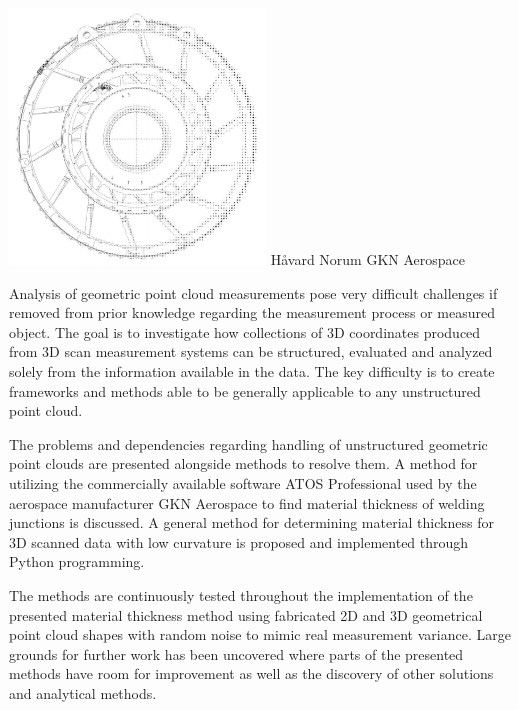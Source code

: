 \documentclass[%
]{USN-MSc}
\begin{document}
\let\cleardoublepage\clearpage
\USNtitlepage%
{%
\includegraphics[width=0.51\textwidth]{fig/TRF Points 2.png}}
{Håvard Norum GKN Aerospace}
{%
Analysis of geometric point cloud measurements pose very difficult challenges if removed from prior knowledge regarding the measurement process or measured object. The goal is to investigate how collections of 3D coordinates produced from 3D scan measurement systems can be structured, evaluated and analyzed solely from the information available in the data. The key difficulty is to create frameworks and methods able to be generally applicable to any unstructured point cloud.

The problems and dependencies regarding handling of unstructured geometric point clouds are presented alongside methods to resolve them. A method for utilizing the commercially available software ATOS Professional used by the aerospace manufacturer GKN Aerospace to find material thickness of welding junctions is discussed. A general method for determining material thickness for 3D scanned data with low curvature is proposed and implemented through Python programming.

The methods are continuously tested throughout the implementation of the presented material thickness method using fabricated 2D and 3D geometrical point cloud shapes with random noise to mimic real measurement variance. Large grounds for further work has been uncovered where parts of the presented methods have room for improvement as well as the discovery of other solutions and analytical methods.

}
\chapter{}
\end{document}

